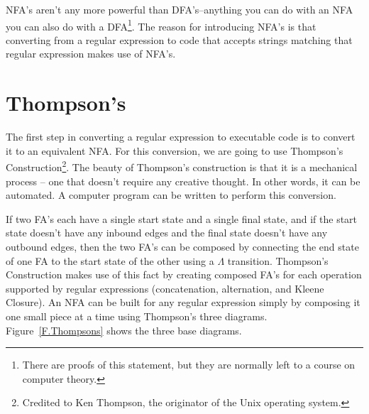 \documentclass[letterpaper,12pt,openany,reqno]{book}%
\begin{document}
NFA's aren't any more powerful than DFA's--anything you can do with an NFA you can also do with a DFA\footnote{There are proofs of this statement, but they are normally left to a course on computer theory.}. The reason for introducing NFA's is that converting from a regular expression to code that accepts strings matching that regular expression makes use of NFA's.

\section{Thompson's}

The first step in converting a regular expression to executable code is to convert it to an equivalent NFA. For this conversion, we are going to use Thompson's Construction\footnote{Credited to Ken Thompson, the originator of the Unix operating system.}. The beauty of Thompson's construction is that it is a mechanical process -- one that doesn't require any creative thought. In other words, it can be automated. A computer program can be written to perform this conversion.

If two FA's each have a single start state and a single final state, and if the start state doesn't have any inbound edges and the final state doesn't have any outbound edges, then the two FA's can be composed by connecting the end state of one FA to the start state of the other using a $\Lambda$ transition. Thompson's Construction makes use of this fact by creating composed FA's for each operation supported by regular expressions (concatenation, alternation, and Kleene Closure). An NFA can be built for any regular expression simply by composing it one small piece at a time using Thompson's three diagrams. Figure~\ref{F.Thompsons} shows the three base diagrams.
\end{document}
